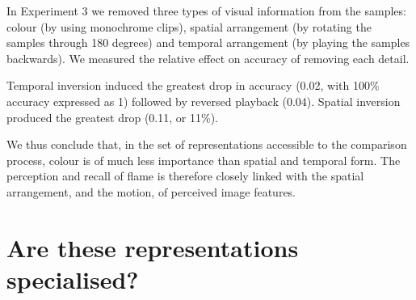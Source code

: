 \documentclass[a4paper]{article}
\begin{document}
In Experiment 3 we removed three types of visual information from the samples: colour (by using monochrome clips), spatial arrangement (by rotating the samples through 180 degrees) and temporal arrangement (by playing the samples backwards). We measured the relative effect on accuracy of removing each detail.



Temporal inversion induced the greatest drop in accuracy (0.02, with 100\% accuracy expressed as 1) followed by reversed playback (0.04). Spatial inversion produced the greatest drop (0.11, or 11\%).

We thus conclude that, in the set of representations accessible to the comparison process, colour is of much less importance than spatial and temporal form. The perception and recall of flame is therefore closely linked with the spatial arrangement, and the motion, of perceived image features.

%
%



\section{Are these representations specialised?}
\end{document}
